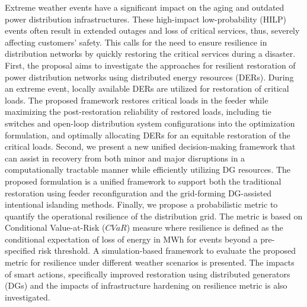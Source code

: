 \documentclass[12pt]{article}
\begin{document}
\vspace{0.9 cm}
 Extreme weather events have a significant impact on the aging and outdated power distribution infrastructures. These high-impact low-probability (HILP) events often result in extended outages and loss of critical services, thus, severely affecting customers' safety. This calls for the need to ensure resilience in distribution networks by quickly restoring the critical services during a disaster. 
 First, the proposal aims to investigate the approaches for resilient restoration of power distribution networks using distributed energy resources (DERs). During an extreme event, locally available DERs are utilized for restoration of critical loads. The proposed framework restores critical loads in the feeder while maximizing the post-restoration reliability of restored loads, including tie switches and open-loop distribution system configurations into the optimization formulation, and optimally allocating DERs for an equitable restoration of the critical loads. 
 Second, we present a new unified decision-making framework that can assist in recovery from both minor and major disruptions in a computationally tractable manner while efficiently utilizing DG resources. The proposed formulation is a unified framework to support both the traditional restoration using feeder reconfiguration and the grid-forming DG-assisted intentional islanding methods. 
 Finally, we propose a probabilistic metric to quantify the operational resilience of the distribution grid. The metric is based on Conditional Value-at-Risk ($CVaR$) measure where resilience is defined as the conditional expectation of loss of energy in MWh for events beyond a pre-specified risk threshold. A simulation-based framework to evaluate the proposed metric for resilience under different weather scenarios is presented. The impacts of smart actions, specifically improved restoration using distributed generators (DGs) and the impacts of infrastructure hardening on resilience metric is also investigated. 

\newpage
\tableofcontents
\newpage




\end{document}
